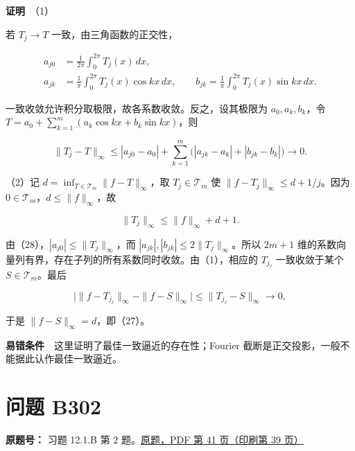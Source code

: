 \documentclass[11pt,a4paper]{article}
\begin{document}
\textbf{证明}　（1）

若 \(T_j\to T\) 一致，由三角函数的正交性，

\begin{equation}
\begin{aligned}
a_{j0}&=\frac1{2\pi}\int_0^{2\pi}T_j(x)\,dx,\\
a_{jk}&=\frac1\pi\int_0^{2\pi}T_j(x)\cos kx\,dx,\qquad
b_{jk}=\frac1\pi\int_0^{2\pi}T_j(x)\sin kx\,dx.
\end{aligned}
\tag{28}
\end{equation}

一致收敛允许积分取极限，故各系数收敛。反之，设其极限为
\(a_0,a_k,b_k\)，令 \(T=a_0+\sum_{k=1}^m(a_k\cos kx+b_k\sin kx)\)，则

\begin{equation}
\|T_j-T\|_\infty
\le|a_{j0}-a_0|+\sum_{k=1}^m\bigl(|a_{jk}-a_k|+|b_{jk}-b_k|\bigr)
\longrightarrow0.
\tag{29}
\end{equation}

（2）记 \(d=\inf_{T\in\mathcal T_m}\|f-T\|_\infty\)，取
\(T_j\in\mathcal T_m\) 使 \(\|f-T_j\|_\infty\le d+1/j\)。因为
\(0\in\mathcal T_m\)，\(d\le\|f\|_\infty\)，故

\begin{equation}
\|T_j\|_\infty\le\|f\|_\infty+d+1.
\tag{30}
\end{equation}

由（28），\(|a_{j0}|\le\|T_j\|_\infty\)，而
\(|a_{jk}|,|b_{jk}|\le2\|T_j\|_\infty\)。所以 \(2m+1\)
维的系数向量列有界，存在子列的所有系数同时收敛。由（1），相应的
\(T_{j_\ell}\) 一致收敛于某个 \(S\in\mathcal T_m\)。最后

\begin{equation}
\bigl|\|f-T_{j_\ell}\|_\infty-\|f-S\|_\infty\bigr|
\le\|T_{j_\ell}-S\|_\infty\longrightarrow0,
\tag{31}
\end{equation}

于是 \(\|f-S\|_\infty=d\)，即（27）。

\textbf{易错条件}　这里证明了最佳一致逼近的存在性；Fourier
截断是正交投影，一般不能据此认作最佳一致逼近。

\section{问题 B302}\label{ux95eeux9898-b302}

\textbf{原题号：} 习题 12.1.B 第 2
题。\href{https://zj139.github.io/math-notes/files/problems/楼分析习题-v2.pdf\#page=41}{原题，PDF
第 41 页（印刷第 39 页）}
\end{document}
